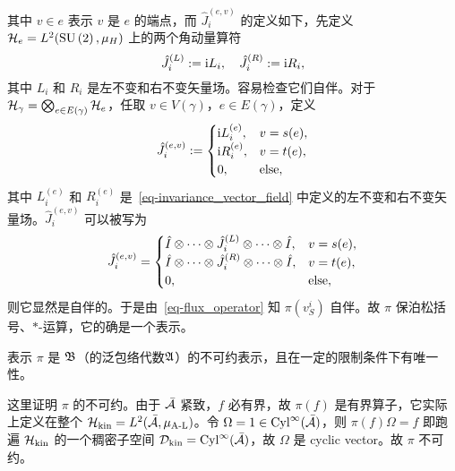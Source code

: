 			其中 $v\in e$ 表示 $v$ 是 $e$ 的端点，而 $\hat{J}^{(e,v)}_i$ 的定义如下，先定义 $\mathcal{H}_e = L^2(\mathrm{SU}\left(2\right),\mu_H)$ 上的两个角动量算符
			\begin{equation}
				\hat{J}^{(L)}_i \definedby \ii L_i \qc \hat{J}^{(R)}_i \definedby \ii R_i,
			\end{equation}
			其中 $L_i$ 和 $R_i$ 是左不变和右不变矢量场。容易检查它们自伴。对于 $\mathcal{H}_\gamma = \bigotimes_{e\in E(\gamma)} \mathcal{H}_e$，任取 $v\in V(\gamma)$，$e\in E(\gamma)$，定义
			\begin{equation}
				\hat{J}^{(e,v)}_i :=
				\begin{cases}
					\mathrm{i} L^{(e)}_i, & v=s(e),\\
					\mathrm{i} R^{(e)}_i, & v=t(e),\\
					0, & \text{else},
				\end{cases}
			\end{equation}
			其中 $L_i^{(e)}$ 和 $R_i^{(e)}$ 是~\eqref{eq-invariance_vector_field} 中定义的左不变和右不变矢量场。$\hat{J}^{(e,v)}_i$ 可以被写为
			\begin{equation}
				\hat{J}^{(e,v)}_i =
				\begin{cases}
					\hat{I} \otimes \cdots \otimes \hat{J}_i^{(L)} \otimes \cdots \otimes \hat{I}, & v=s(e),\\
					\hat{I} \otimes \cdots \otimes \hat{J}_i^{(R)} \otimes \cdots \otimes \hat{I}, & v=t(e),\\
					0, & \text{else},
				\end{cases}
			\end{equation}
			则它显然是自伴的。于是由~\eqref{eq-flux_operator} 知 $\pi\left(v^i_S\right)$ 自伴。故 $\pi$ 保泊松括号、$*$-运算，它的确是一个表示。
			\begin{Theorem}
				表示 $\pi$ 是 $\mathfrak{B}$（的泛包络代数$\mathfrak{A}$）的不可约表示，且在一定的限制条件下有唯一性。
			\end{Theorem}
			\begin{Proof}
				这里证明 $\pi$ 的不可约。由于 $\bar{\mathcal{A}}$ 紧致，$f$ 必有界，故 $\pi(f)$ 是有界算子，它实际上定义在整个 $\mathcal{H}_{\text{kin}} = L^2(\bar{\mathcal{A}},\mu_{\text{A-L}})$。令 $\Omega = 1 \in \mathrm{Cyl}^\infty(\bar{\mathcal{A}})$，则 $\pi(f) \Omega = f$ 即跑遍 $\mathcal{H}_{\text{kin}}$ 的一个稠密子空间 $\mathcal{D}_{\text{kin}} = \mathrm{Cyl}^\infty(\bar{\mathcal{A}})$，故 $\Omega$ 是 cyclic vector。故 $\pi$ 不可约。
			\end{Proof}
	